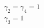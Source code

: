 \documentclass[preview]{standalone}
\begin{document}
\begin{center}
$\gamma_2 = \gamma_4 = 1$\\$\gamma_3 = 1$
\end{center}
\end{document}
